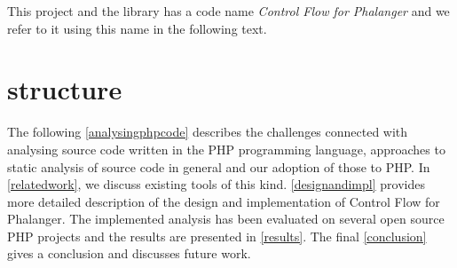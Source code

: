     This project and the library has a code name \emph{Control Flow for Phalanger} 
    and we refer to it using this name in the following text.
    
    \section{\wThesis{} structure}
    
    The following \wchapter{} \ref{analysingphpcode} describes the challenges 
    connected with analysing source code 
    written in the PHP programming language, approaches to static analysis of 
    source code in general and our adoption of those to PHP. 
    In \wchapter{} \ref{relatedwork}, we discuss existing tools of this kind. 
    \wChapter{} \ref{designandimpl} provides more detailed description of the design 
    and implementation of Control Flow for Phalanger. 
    The implemented analysis has been evaluated on several open source 
    PHP projects and the results are presented in \wchapter{} \ref{results}. 
    The final \wchapter{} \ref{conclusion} gives a conclusion and 
    discusses future work.
    